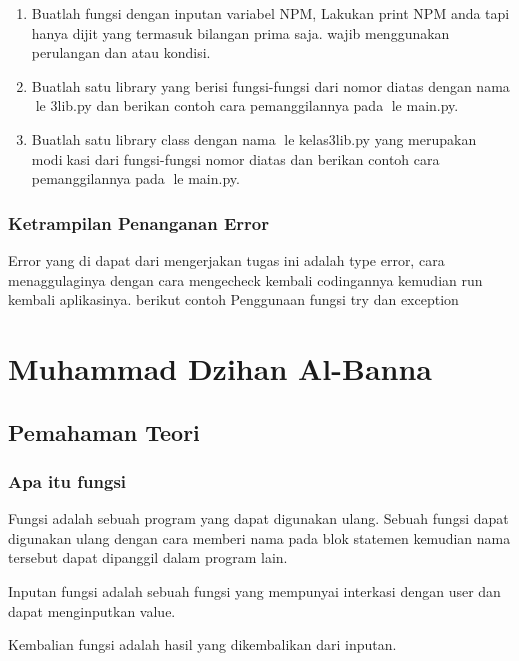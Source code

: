 \begin{enumerate}
    
    \item Buatlah fungsi dengan inputan variabel NPM, Lakukan print NPM anda tapi hanya dijit yang termasuk bilangan prima saja. wajib menggunakan perulangan dan atau kondisi.
    
    \item Buatlah satu library yang berisi fungsi-fungsi dari nomor diatas dengan nama le 3lib.py dan berikan contoh cara pemanggilannya pada le main.py.
    
    \item Buatlah satu library class dengan nama le kelas3lib.py yang merupakan modikasi dari fungsi-fungsi nomor diatas dan berikan contoh cara pemanggilannya pada le main.py.
    
\end{enumerate}

\subsubsection{Ketrampilan Penanganan Error}
Error yang di dapat dari mengerjakan tugas ini adalah type error, cara menaggulaginya dengan cara mengecheck kembali codingannya kemudian run kembali aplikasinya. berikut contoh Penggunaan fungsi try dan exception


\section{Muhammad Dzihan Al-Banna}
\subsection{Pemahaman Teori}
\subsubsection{Apa itu fungsi}
Fungsi adalah sebuah program yang dapat digunakan ulang. Sebuah fungsi dapat digunakan ulang dengan cara memberi nama pada blok statemen kemudian nama tersebut dapat dipanggil dalam program lain.

Inputan fungsi adalah sebuah fungsi yang mempunyai interkasi dengan user dan dapat menginputkan value.

Kembalian fungsi adalah hasil yang dikembalikan dari inputan.

